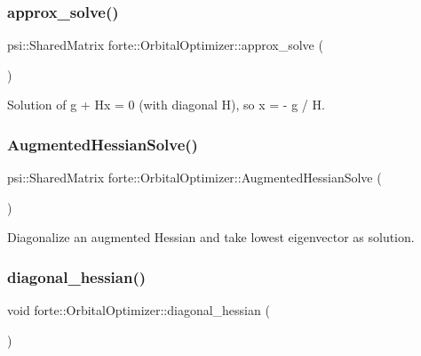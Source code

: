 \subsubsection{\texorpdfstring{approx\+\_\+solve()}{approx\_solve()}}
{\footnotesize\ttfamily psi\+::\+Shared\+Matrix forte\+::\+Orbital\+Optimizer\+::approx\+\_\+solve (\begin{DoxyParamCaption}{ }\end{DoxyParamCaption})}



Solution of g + Hx = 0 (with diagonal H), so x = -\/ g / H. 

\mbox{\label{classforte_1_1_orbital_optimizer_af3aa08d3914c100e2ac1ac738d462881}} 
\subsubsection{\texorpdfstring{Augmented\+Hessian\+Solve()}{AugmentedHessianSolve()}}
{\footnotesize\ttfamily psi\+::\+Shared\+Matrix forte\+::\+Orbital\+Optimizer\+::\+Augmented\+Hessian\+Solve (\begin{DoxyParamCaption}{ }\end{DoxyParamCaption})\hspace{0.3cm}{\ttfamily [protected]}}



Diagonalize an augmented Hessian and take lowest eigenvector as solution. 

\mbox{\label{classforte_1_1_orbital_optimizer_a160f10316ab646946b81b29588c15dd9}} 
\subsubsection{\texorpdfstring{diagonal\+\_\+hessian()}{diagonal\_hessian()}}
{\footnotesize\ttfamily void forte\+::\+Orbital\+Optimizer\+::diagonal\+\_\+hessian (\begin{DoxyParamCaption}{ }\end{DoxyParamCaption})\hspace{0.3cm}{\ttfamily [protected]}}



